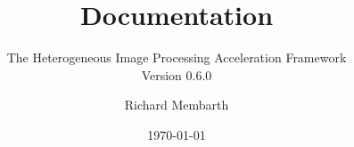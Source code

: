 


\title{\hipacc{} Documentation}
\subtitle{The Heterogeneous Image Processing Acceleration Framework\\Version 0.6.0}
\author{Richard Membarth}
\date{\today}

\maketitle

\cleardoublepage
\tableofcontents
\cleardoublepage






\nocite{membarth2011ggc}
\nocite{membarth2012gdg}
\nocite{membarth2012aoi}
\nocite{membarth2012msv}
\cleardoublepage
\appendix





